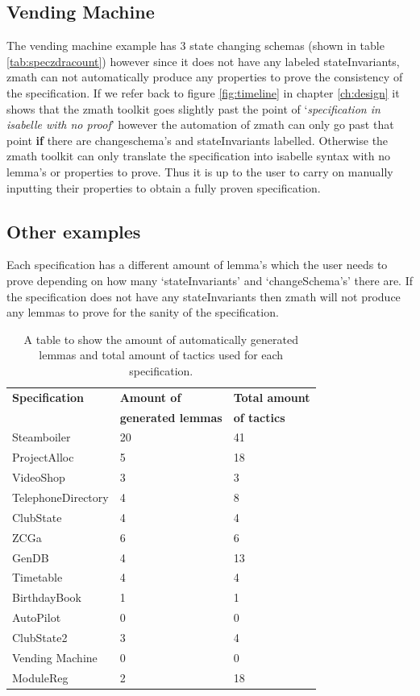 \subsection{Vending Machine}

The vending machine example has 3 state changing schemas (shown in table \ref{tab:speczdracount}) however since it does not have any labeled stateInvariants, \gls{zmath} can not automatically produce any properties to prove the consistency of the specification. If we refer back to figure \ref{fig:timeline} in chapter \ref{ch:design} it shows that the \gls{zmath} toolkit goes slightly past the point of `\emph{specification in isabelle with no proof}' however the automation of \gls{zmath} can only go past that point \textbf{if} there are changeschema's and stateInvariants labelled. Otherwise the \gls{zmath} toolkit can only translate the specification into isabelle syntax with no lemma's or properties to prove. Thus it is up to the user to carry on manually inputting their properties to obtain a fully proven specification.

\subsection{Other examples}

Each specification has a different amount of lemma's which the user needs to prove depending on how many `stateInvariants' and `changeSchema's' there are. If the specification does not have any stateInvariants then \gls{zmath} will not produce any lemmas to prove for the sanity of the specification.

\begin{table}
\begin{tabular}{|l | l | l |}
\hline
\textbf{Specification} & \textbf{Amount of} & \textbf{Total amount} \\
& \textbf{generated lemmas} & \textbf{of tactics} \\
\hline
Steamboiler & 20 & 41 \\
ProjectAlloc & 5 & 18 \\
VideoShop & 3 & 3 \\
TelephoneDirectory & 4 & 8 \\
ClubState & 4 & 4 \\
ZCGa & 6 & 6 \\
GenDB & 4 & 13 \\
Timetable & 4 & 4 \\
BirthdayBook & 1 & 1\\
AutoPilot & 0 & 0 \\
ClubState2 & 3 & 4 \\
Vending Machine & 0 & 0 \\
ModuleReg & 2 & 18 \\
\hline
\end{tabular}
\caption{A table to show the amount of automatically generated lemmas and total amount of tactics used for each specification. \label{tab:lemmatact}}
\end{table}

